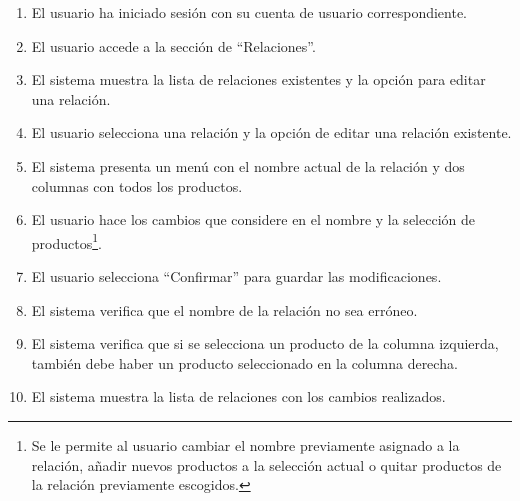 \begin{enumerate}
    \item El usuario ha iniciado sesión con su cuenta de usuario correspondiente.
    \item El usuario accede a la sección de \enquote{Relaciones}.
    \item El sistema muestra la lista de relaciones existentes y la opción para editar una relación.
    \item El usuario selecciona una relación y la opción de editar una relación existente.
    \item El sistema presenta un menú con el nombre actual de la relación y dos columnas con todos los productos.
    \item El usuario hace los cambios que considere en el nombre y la selección de productos\footnote{Se le permite al usuario cambiar el nombre previamente asignado a la relación, añadir nuevos productos a la selección actual o quitar productos de la relación previamente escogidos.}.
    \item El usuario selecciona \enquote{Confirmar} para guardar las modificaciones.
    \item El sistema verifica que el nombre de la relación no sea erróneo.
    \item El sistema verifica que si se selecciona un producto de la columna izquierda, también debe haber un producto seleccionado en la columna derecha.
    \item El sistema muestra la lista de relaciones con los cambios realizados.
\end{enumerate}

